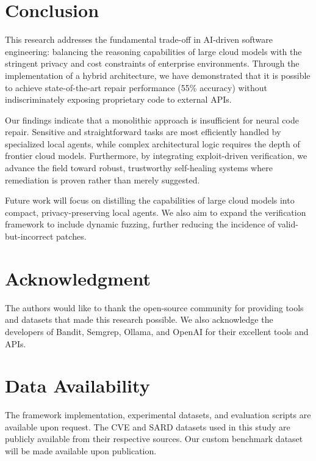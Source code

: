 \documentclass[conference]{IEEEtran}
\begin{document}
\section{Conclusion}

This research addresses the fundamental trade-off in AI-driven software engineering: balancing the reasoning capabilities of large cloud models with the stringent privacy and cost constraints of enterprise environments. Through the implementation of a hybrid architecture, we have demonstrated that it is possible to achieve state-of-the-art repair performance (55\% accuracy) without indiscriminately exposing proprietary code to external APIs.

Our findings indicate that a monolithic approach is insufficient for neural code repair. Sensitive and straightforward tasks are most efficiently handled by specialized local agents, while complex architectural logic requires the depth of frontier cloud models. Furthermore, by integrating exploit-driven verification, we advance the field toward robust, trustworthy self-healing systems where remediation is proven rather than merely suggested.

Future work will focus on distilling the capabilities of large cloud models into compact, privacy-preserving local agents. We also aim to expand the verification framework to include dynamic fuzzing, further reducing the incidence of valid-but-incorrect patches.

\section*{Acknowledgment}

The authors would like to thank the open-source community for providing tools and datasets that made this research possible. We also acknowledge the developers of Bandit, Semgrep, Ollama, and OpenAI for their excellent tools and APIs.

\section*{Data Availability}

The framework implementation, experimental datasets, and evaluation scripts are available upon request. The CVE and SARD datasets used in this study are publicly available from their respective sources. Our custom benchmark dataset will be made available upon publication.
\end{document}

